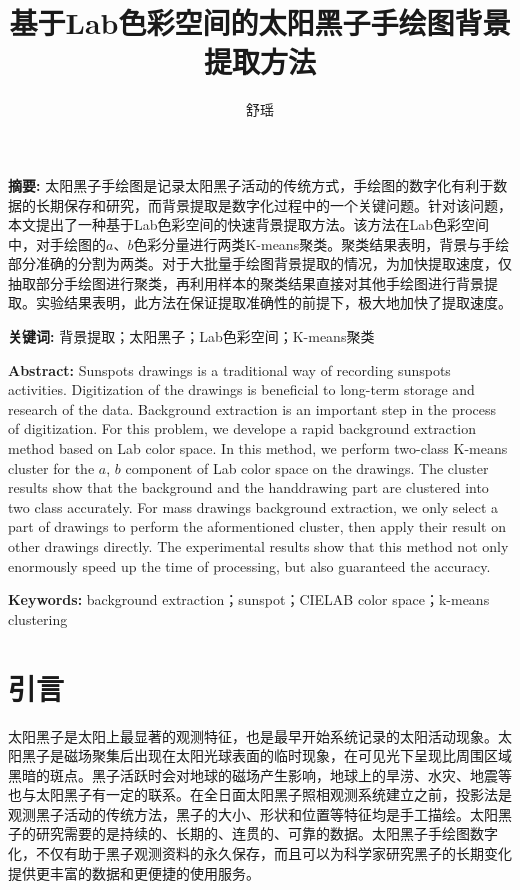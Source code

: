 \documentclass[UTF8,a4paper,twoside]{ctexart}
\title{基于Lab色彩空间的太阳黑子手绘图背景提取方法}
\author{舒瑶}
\date{}
\begin{document}
\maketitle

\textbf{摘要: }太阳黑子手绘图是记录太阳黑子活动的传统方式，手绘图的数字化有利于数据的长期保存和研究，而背景提取是数字化过程中的一个关键问题。针对该问题，本文提出了一种基于Lab色彩空间的快速背景提取方法。该方法在Lab色彩空间中，对手绘图的$a$、$b$色彩分量进行两类K-means聚类。聚类结果表明，背景与手绘部分准确的分割为两类。对于大批量手绘图背景提取的情况，为加快提取速度，仅抽取部分手绘图进行聚类，再利用样本的聚类结果直接对其他手绘图进行背景提取。实验结果表明，此方法在保证提取准确性的前提下，极大地加快了提取速度。

\textbf{关键词: }背景提取；太阳黑子；Lab色彩空间；K-means聚类

\textbf{Abstract: }Sunspots drawings is a traditional way of recording sunspots activities. Digitization of the drawings is beneficial to long-term storage and research of the data. Background extraction is an important step in the process of digitization. For this problem, we develope a rapid background extraction method based on Lab color space. In this method, we perform two-class K-means cluster for the $a$, $b$ component of Lab color space on the drawings. The cluster results show that the background and the handdrawing part are clustered into two class accurately. For mass drawings background extraction, we only select a part of drawings to perform the aformentioned cluster, then apply their result on other drawings directly. The experimental results show that this method not only enormously speed up the time of processing, but also guaranteed the accuracy.

\textbf{Keywords: }background extraction；sunspot；CIELAB color space；k-means clustering

\section{引言}
太阳黑子是太阳上最显著的观测特征，也是最早开始系统记录的太阳活动现象\cite{李冉阳2016}。太阳黑子是磁场聚集后出现在太阳光球表面的临时现象，在可见光下呈现比周围区域黑暗的斑点。黑子活跃时会对地球的磁场产生影响，地球上的旱涝、水灾、地震等也与太阳黑子有一定的联系\cite{刘学富1999太阳黑子的观测}。在全日面太阳黑子照相观测系统建立之前，投影法是观测黑子活动的传统方法，黑子的大小、形状和位置等特征均是手工描绘。太阳黑子的研究需要的是持续的、长期的、连贯的、可靠的数据。太阳黑子手绘图数字化，不仅有助于黑子观测资料的永久保存，而且可以为科学家研究黑子的长期变化提供更丰富的数据和更便捷的使用服务。
\end{document}

